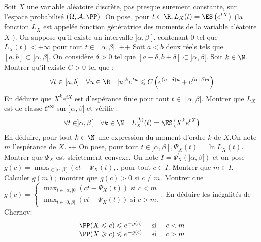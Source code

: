 \begin{exercise}[title=Fonction génératrice des moments]
Soit $X$ une variable aléatoire discrète, pas presque surement constante, sur l'espace probabilisé $(\Omega, \mathcal{A}, \PP) $. On pose, pour $t \in \R, L_{X}(t)=\ES\left(e^{t X}\right)$ (la fonction $L_{X}$ est appelée fonction génératrice des moments de la variable aléatoire $X$ ). On suppose qu'il existe un intervalle $] \alpha, \beta\left[\right.$. contenant 0 tel que $L_{X}(t)<+\infty$ pour tout $\left.t \in\right] \alpha, \beta[$.
\question+\question+ Soit $a<b$ deux réels tels que $[a, b] \subset] \alpha, \beta[$. On considère $\delta>0$ tel que $[a-\delta, b+\delta] \subset] \alpha, \beta[$. Soit $k \in \N$. Montrer qu'il existe $C>0$ tel que :
\begin{equation*}
\forall t \in[a, b] \quad \forall u \in \R \quad|u|^{k} e^{t u} \leqslant C\left(e^{(a-\delta) u}+e^{(b+\delta) u}\right)
\end{equation*}
En déduire que $X^{k} e^{t X}$ est d'espérance finie pour tout $\left.t \in\right] \alpha, \beta[$.
\question Montrer que $L_{X}$ est de classe $\mathcal{C}^{\infty}$ sur $] \alpha, \beta[$ et vérifie :
\begin{equation*}
\forall t \in] \alpha, \beta[\quad \forall k \in \N \quad L_{X}^{(k)}(t)=\ES\big(X^{k} e^{t X}\big)
\end{equation*}
En déduire, pour tout $k \in \N$ une expression du moment d'ordre $k$ de $X . \mathrm{On}$ note $m$ l'espérance de $X$.
\question-\question+ On pose, pour tout $t \in] \alpha, \beta\left[, \Psi_{X}(t)=\ln L_{X}(t)\right.$.
Montrer que $\Psi_{X}$ est strictement convexe.
\question On note $I=\Psi_{X}^{\prime}(] \alpha, \beta[)$ et on pose $g(c)=\max _{t \in] \alpha, \beta[}\left(c t-\Psi_{X}(t),\right.$. pour tout $c \in I$.
Montrer que $m \in I$. Calculer $g(m) ;$ montrer que $g(c)>0$ si $c \neq m$.
\question Montrer que $g(c)=\left\{\begin{array}{l}\max _{t \in] \alpha, [0}\left(c t-\Psi_{X}(t)\right) \text { si } c<m \\ \max _{t \in] 0, \beta[}\left(c t-\Psi_{X}(t)\right) \text { si } c>m .\end{array}\right.$.
\question En déduire les inégalités de Chernov:
\begin{equation*}
\begin{array}{lll}
\PP(X \leqslant c) \leqslant e^{-g(c)} & \text { si } & c<m \\
\PP(X \geqslant c) \leqslant e^{-g(c)} & \text { si } & c>m
\end{array}
\end{equation*}


\end{exercise}
